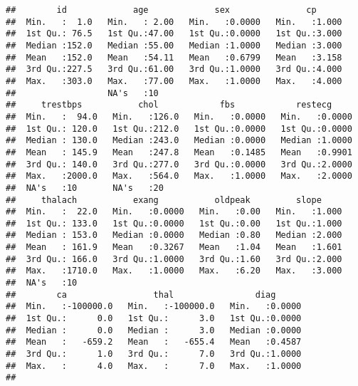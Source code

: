 \documentclass[
]{article}
\newenvironment{Shaded}{\begin{snugshade}}{\end{snugshade}}
\newcommand{\CommentTok}[1]{\textcolor[rgb]{0.56,0.35,0.01}{\textit{#1}}}
\newcommand{\FunctionTok}[1]{\textcolor[rgb]{0.00,0.00,0.00}{#1}}
\newcommand{\NormalTok}[1]{#1}
\newcommand{\SpecialCharTok}[1]{\textcolor[rgb]{0.00,0.00,0.00}{#1}}
\begin{document}
\begin{verbatim}
##        id             age             sex               cp       
##  Min.   :  1.0   Min.   : 2.00   Min.   :0.0000   Min.   :1.000  
##  1st Qu.: 76.5   1st Qu.:47.00   1st Qu.:0.0000   1st Qu.:3.000  
##  Median :152.0   Median :55.00   Median :1.0000   Median :3.000  
##  Mean   :152.0   Mean   :54.11   Mean   :0.6799   Mean   :3.158  
##  3rd Qu.:227.5   3rd Qu.:61.00   3rd Qu.:1.0000   3rd Qu.:4.000  
##  Max.   :303.0   Max.   :77.00   Max.   :1.0000   Max.   :4.000  
##                  NA's   :10                                      
##     trestbps           chol            fbs            restecg      
##  Min.   :  94.0   Min.   :126.0   Min.   :0.0000   Min.   :0.0000  
##  1st Qu.: 120.0   1st Qu.:212.0   1st Qu.:0.0000   1st Qu.:0.0000  
##  Median : 130.0   Median :243.0   Median :0.0000   Median :1.0000  
##  Mean   : 145.9   Mean   :247.8   Mean   :0.1485   Mean   :0.9901  
##  3rd Qu.: 140.0   3rd Qu.:277.0   3rd Qu.:0.0000   3rd Qu.:2.0000  
##  Max.   :2000.0   Max.   :564.0   Max.   :1.0000   Max.   :2.0000  
##  NA's   :10       NA's   :20                                       
##     thalach           exang           oldpeak         slope      
##  Min.   :  22.0   Min.   :0.0000   Min.   :0.00   Min.   :1.000  
##  1st Qu.: 133.0   1st Qu.:0.0000   1st Qu.:0.00   1st Qu.:1.000  
##  Median : 153.0   Median :0.0000   Median :0.80   Median :2.000  
##  Mean   : 161.9   Mean   :0.3267   Mean   :1.04   Mean   :1.601  
##  3rd Qu.: 166.0   3rd Qu.:1.0000   3rd Qu.:1.60   3rd Qu.:2.000  
##  Max.   :1710.0   Max.   :1.0000   Max.   :6.20   Max.   :3.000  
##  NA's   :10                                                      
##        ca                 thal                diag       
##  Min.   :-100000.0   Min.   :-100000.0   Min.   :0.0000  
##  1st Qu.:      0.0   1st Qu.:      3.0   1st Qu.:0.0000  
##  Median :      0.0   Median :      3.0   Median :0.0000  
##  Mean   :   -659.2   Mean   :   -655.4   Mean   :0.4587  
##  3rd Qu.:      1.0   3rd Qu.:      7.0   3rd Qu.:1.0000  
##  Max.   :      4.0   Max.   :      7.0   Max.   :1.0000  
## 
\end{verbatim}

\begin{Shaded}
\end{Shaded}
\end{document}
